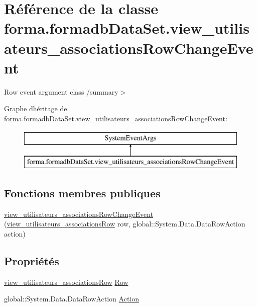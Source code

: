 \hypertarget{classforma_1_1formadb_data_set_1_1view__utilisateurs__associations_row_change_event}{}\section{Référence de la classe forma.\+formadb\+Data\+Set.\+view\+\_\+utilisateurs\+\_\+associations\+Row\+Change\+Event}
\label{classforma_1_1formadb_data_set_1_1view__utilisateurs__associations_row_change_event}


Row event argument class /summary$>$  


Graphe d\textquotesingle{}héritage de forma.\+formadb\+Data\+Set.\+view\+\_\+utilisateurs\+\_\+associations\+Row\+Change\+Event\+:\begin{figure}[H]
\begin{center}
\leavevmode
\includegraphics[height=2.000000cm]{classforma_1_1formadb_data_set_1_1view__utilisateurs__associations_row_change_event}
\end{center}
\end{figure}
\subsection*{Fonctions membres publiques}
\begin{DoxyCompactItemize}
\item 
\hyperlink{classforma_1_1formadb_data_set_1_1view__utilisateurs__associations_row_change_event_af23cea95b771fecf65fbeb683e9ae12a}{view\+\_\+utilisateurs\+\_\+associations\+Row\+Change\+Event} (\hyperlink{classforma_1_1formadb_data_set_1_1view__utilisateurs__associations_row}{view\+\_\+utilisateurs\+\_\+associations\+Row} row, global\+::\+System.\+Data.\+Data\+Row\+Action action)
\end{DoxyCompactItemize}
\subsection*{Propriétés}
\begin{DoxyCompactItemize}
\item 
\hyperlink{classforma_1_1formadb_data_set_1_1view__utilisateurs__associations_row}{view\+\_\+utilisateurs\+\_\+associations\+Row} \hyperlink{classforma_1_1formadb_data_set_1_1view__utilisateurs__associations_row_change_event_a1b728b51acc5f32e80cf9791201bd09c}{Row}
\item 
global\+::\+System.\+Data.\+Data\+Row\+Action \hyperlink{classforma_1_1formadb_data_set_1_1view__utilisateurs__associations_row_change_event_a4fd74fb4eb28f0d5a5405dc2a40ab070}{Action}
\end{DoxyCompactItemize}


